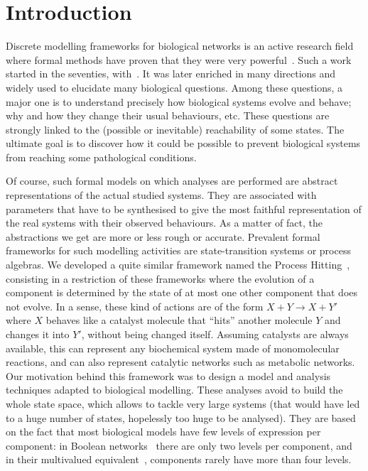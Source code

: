 \section{Introduction}
\label{sec:intro}

Discrete modelling frameworks for biological networks is an active research field where formal methods have proven that they were very
powerful~\cite{thomas1990biological,deJong02,snoussi_logical_1993}.
Such a work started in the seventies, with~\cite{kauffman69,Thomas73}.
It was later enriched in many directions and widely used to elucidate many biological questions.
Among these questions, a major one is to understand precisely how biological systems evolve and behave; why and how they change their usual behaviours, etc.
These questions are strongly linked to the (possible or inevitable) reachability of some states.
The ultimate goal is to discover how it could be possible to prevent biological systems from reaching some pathological conditions.

Of course, such formal models on which analyses are performed are abstract representations of the actual studied systems.
They are associated with parameters that have to be synthesised %
to give the most faithful representation of the real systems with their observed behaviours.
As a matter of fact, the abstractions we get are more or less rough or accurate.
Prevalent formal frameworks for such modelling activities are state-transition systems or process algebras. %
We developed a quite similar framework named the Process Hitting~\cite{PMR10-TCSB},
consisting in a restriction of these frameworks where the evolution of a component is determined by the state of at most one other component that does not evolve.
In a sense, these kind of actions are of the form $X + Y \rightarrow X + Y'$ where $X$ behaves like a catalyst molecule that “hits” another molecule $Y$ and changes it into $Y'$, without being changed itself.
Assuming catalysts are always available, this can represent any biochemical system made of monomolecular reactions, and can also represent catalytic networks such as metabolic networks.
Our motivation behind this framework was to design a model and analysis techniques adapted to biological modelling.
These analyses avoid to build the whole state space, which allows to tackle very large systems (that would have led to a huge number of states, hopelessly too huge to be analysed).
They are based on the fact that most biological models have few levels of expression per component:
in Boolean networks~\cite{kauffman69,Thomas73} there are only two levels per component, and in their multivalued equivalent~\cite{deJong02}, components rarely have more than four levels.

